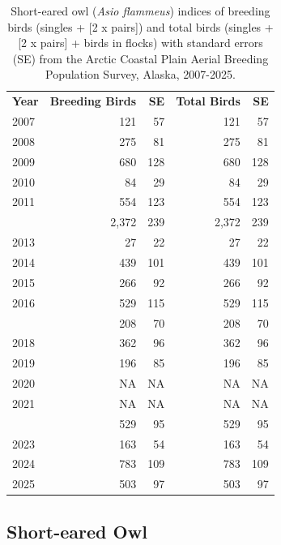 \documentclass[
]{article}
\begin{document}
\begin{longtable}[t]{lrrrr}

\caption{\label{tbl-SEOW}Short-eared owl (\emph{Asio flammeus}) indices
of breeding birds (singles + {[}2 x pairs{]}) and total birds (singles +
{[}2 x pairs{]} + birds in flocks) with standard errors (SE) from the
Arctic Coastal Plain Aerial Breeding Population Survey, Alaska,
2007-2025.}

\tabularnewline

\\
\toprule
\textbf{Year} & \textbf{Breeding Birds} & \textbf{SE} & \textbf{Total Birds} & \textbf{SE}\\
\midrule
2007 & 121 & 57 & 121 & 57\\
2008 & 275 & 81 & 275 & 81\\
2009 & 680 & 128 & 680 & 128\\
2010 & 84 & 29 & 84 & 29\\
2011 & 554 & 123 & 554 & 123\\
\addlinespace
2012 & 2,372 & 239 & 2,372 & 239\\
2013 & 27 & 22 & 27 & 22\\
2014 & 439 & 101 & 439 & 101\\
2015 & 266 & 92 & 266 & 92\\
2016 & 529 & 115 & 529 & 115\\
\addlinespace
2017 & 208 & 70 & 208 & 70\\
2018 & 362 & 96 & 362 & 96\\
2019 & 196 & 85 & 196 & 85\\
2020 & NA & NA & NA & NA\\
2021 & NA & NA & NA & NA\\
\addlinespace
2022 & 529 & 95 & 529 & 95\\
2023 & 163 & 54 & 163 & 54\\
2024 & 783 & 109 & 783 & 109\\
2025 & 503 & 97 & 503 & 97\\
\bottomrule

\end{longtable}

\endgroup{}

\newpage{}

\subsection*{Short-eared Owl}\label{short-eared-owl-2}
\end{document}
